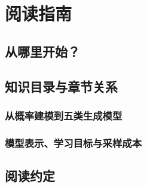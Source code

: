 \chapter{阅读指南}
\label{chap:reading-guide}

\section{从哪里开始？}
\label{sec:reading-guide-routes}
\contentplaceholder

\section{知识目录与章节关系}
\label{sec:reading-guide-roadmap}
\contentplaceholder

\subsection{从概率建模到五类生成模型}
\label{subsec:reading-guide-connections}
\contentplaceholder

\subsection{模型表示、学习目标与采样成本}
\label{subsec:reading-guide-comparison}
\contentplaceholder

\section{阅读约定}
\label{sec:reading-guide-conventions}
\contentplaceholder
